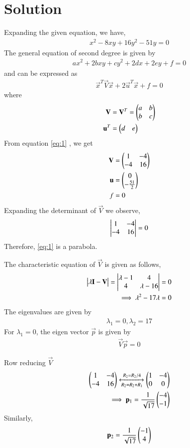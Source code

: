 \documentclass[journal,12pt,twocolumn]{IEEEtran}
\begin{document}
\section{Solution}
Expanding the given equation, we have,
\begin{align}
    x^2 -8xy +16y^2 -51y =0 \label{eq:1}
\end{align}
The general equation of second degree is given by
\begin{align}
	ax^2+2bxy+cy^2+2dx+2ey+f=0 \label{gen_eq}
\end{align}
and can be expressed as
\begin{align}
	\vec{x}^T\vec{V}\vec{x}+2\vec{u}^T\vec{x}+f=0 \label{conic_eq}
\end{align}
where
\begin{align}
	\mathbf{V} &= \mathbf{V}^T = \begin{pmatrix}a & b \\ b & c\end{pmatrix}
	\\
	\mathbf{u}^T &= \begin{pmatrix}d & e\end{pmatrix}
\end{align}
From equation \eqref{eq:1} , we get
\begin{align}
	\mathbf{V} &= \begin{pmatrix}1 & -4\\-4 & 16\end{pmatrix}\label{eq:2}\\
	\mathbf{u} &= \begin{pmatrix}0\\-\frac{51}{2}\end{pmatrix}\label{eq:3}\\ 
	f &= 0 \label{eq:4}
\end{align}
Expanding the determinant of $\vec{V}$ we observe, 
\begin{align}
	\begin{vmatrix}1 & -4\\-4 & 16\end{vmatrix} = 0
\end{align}
Therefore, \eqref{eq:1} is a parabola.

The characteristic equation of $\vec{V}$ is given as follows,
\begin{align}
		\begin{vmatrix}\lambda\mathbf{I}-\mathbf{V}\end{vmatrix} = \begin{vmatrix}\lambda-1&4\\ 4&\lambda-16\end{vmatrix} &= 0\\
		\implies \lambda^2-17\lambda &= 0\label{eq:5}
\end{align}
The eigenvalues are given by
\begin{align}
		\lambda_1=0, \lambda_2=17\label{eq:6}    
\end{align}
For $\lambda_1 = 0$, the eigen vector $\vec{p}$ is given by 
\begin{align}
		\vec{V}\vec{p} = 0
\end{align}

Row reducing $\vec{V}$ 
\begin{align}
		\begin{pmatrix}1&-4\\-4&16\end{pmatrix}\xleftrightarrow[R_2=R_2+R_1]{R_2=R_2/4}\begin{pmatrix}1&-4\\0&0\end{pmatrix}\\
		\implies\mathbf{p}_1=\frac{1}{\sqrt{17}}\begin{pmatrix}-4\\-1\end{pmatrix} \label{eq:7}
\end{align}
Similarly, 
\begin{align}
		\mathbf{p}_2=\frac{1}{\sqrt{17}}\begin{pmatrix}-1\\4\end{pmatrix} \label{eq:8}
\end{align}
\end{document}
